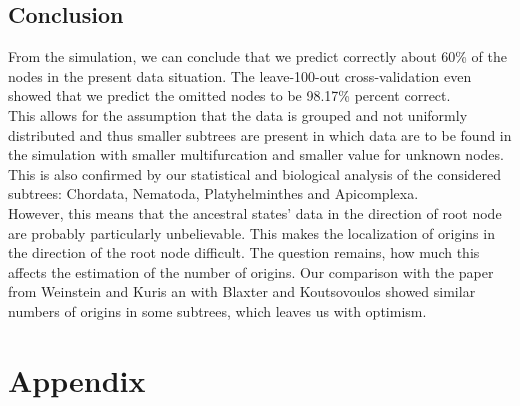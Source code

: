   \section{Conclusion}

    From the simulation, we can conclude that we predict correctly about 60\% of the nodes in the 
      present data situation. The leave-100-out cross-validation even showed that we predict the 
      omitted nodes to be 98.17\% percent correct. \\
    This allows for the assumption that the data is grouped and not uniformly distributed and thus 
      smaller subtrees are present in which data are to be found in the simulation with smaller 
      multifurcation and smaller value for unknown nodes. This is also confirmed by our statistical 
      and biological analysis of the considered subtrees: Chordata, Nematoda, Platyhelminthes and 
      Apicomplexa. \\
    However, this means that the ancestral states' data in the direction of root node are probably 
      particularly unbelievable. This makes the localization of origins in the direction of the root 
      node difficult. The question remains, how much this affects the estimation of the number of 
      origins. Our comparison with the paper from Weinstein and Kuris \cite{Weinstein2016} an with
      Blaxter and Koutsovoulos \cite{Blaxter2015} showed similar numbers of origins in some subtrees, 
      which leaves us with optimism.



\chapter{Appendix}
